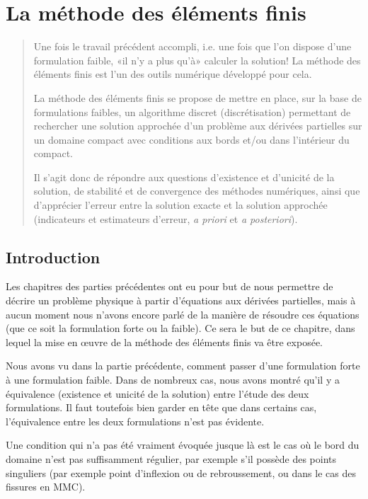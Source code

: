 \chapter{La méthode des éléments finis}\label{Ch-MEF}
\begin{abstract}
Une fois le travail précédent accompli, i.e. une fois que l'on dispose d'une
formulation faible, «il n'y a plus qu'à» calculer la solution!
La méthode des éléments finis est l'un des outils numérique développé pour cela.

La méthode des éléments finis se propose de mettre en place, sur la base de
formulations faibles, un algorithme discret (discrétisation) permettant de rechercher
une solution approchée d'un problème aux dérivées partielles sur un domaine
compact avec conditions aux bords et/ou dans l'intérieur du compact.

Il s'agit donc de répondre aux questions d'existence et d'unicité de la solution,
de stabilité et de convergence des méthodes numériques, ainsi que d'apprécier
l'erreur entre la solution exacte et la solution approchée (indicateurs et estimateurs
d'erreur, \emph{a priori} et \emph{a posteriori}).
\end{abstract}

\medskip
\section{Introduction}
Les chapitres des parties précédentes ont eu pour but de nous permettre de décrire
un problème physique à partir d'équations aux dérivées partielles, mais à aucun moment nous n'avons encore
parlé de la manière de résoudre ces équations (que ce soit la formulation forte ou la faible). Ce sera le but de ce chapitre, dans lequel la mise en œuvre de la méthode
des éléments finis va être exposée.

\medskip
Nous avons vu dans la partie précédente, comment passer d'une formulation
forte à une formulation faible. Dans de nombreux cas, nous avons montré qu'il y a équivalence (existence et unicité de la solution) entre l'étude des deux formulations. Il faut toutefois bien garder en tête que dans certains cas, l'équivalence entre les deux
formulations n'est pas évidente.

Une condition qui n'a pas été vraiment évoquée jusque là est le cas où
le bord du domaine n'est pas suffisamment régulier, par exemple
s'il possède des points singuliers (par exemple point d'inflexion ou de rebroussement, ou
dans le cas des fissures en MMC).

